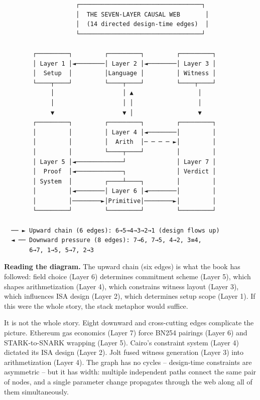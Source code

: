 \documentclass[
  11pt,
  openany]{report}
\renewcommand{\textbf}[1]{{\bfseries\color{MidnightBold}#1}}
\begin{document}
\begin{verbatim}
                    ┌──────────────────────────────────┐
                    │  THE SEVEN-LAYER CAUSAL WEB       │
                    │  (14 directed design-time edges)  │
                    └──────────────────────────────────┘

        ┌─────────┐         ┌─────────┐         ┌─────────┐
        │ Layer 1 │◄────────│ Layer 2 │◄────────│ Layer 3 │
        │  Setup  │         │Language │         │ Witness │
        └────┬────┘         └────┬────┘         └────┬────┘
             │                   │ ▲                  │
             │                   │ │                  │
             ▼                   ▼ │                  ▼
        ┌─────────┐         ┌─────────┐         ┌─────────┐
        │         │         │ Layer 4 │◄────────│         │
        │         │         │  Arith  │─ ─ ─ ─ ►│         │
        │         │         └────┬────┘         │         │
        │ Layer 5 │◄─────────────┘              │ Layer 7 │
        │  Proof  │◄─────────────┐              │ Verdict │
        │ System  │         ┌────┴────┐         │         │
        │         │◄────────│ Layer 6 │◄────────│         │
        │         │────────►│Primitive│────────►│         │
        └─────────┘         └─────────┘         └─────────┘

  ── ► Upward chain (6 edges): 6→5→4→3→2→1 (design flows up)
  ◄ ── Downward pressure (8 edges): 7→6, 7→5, 4→2, 3≡4,
       6→7, 1→5, 5→7, 2→3
\end{verbatim}

\textbf{Reading the diagram.} The upward chain (six edges) is what the book has
followed: field choice (Layer 6) determines commitment scheme (Layer 5), which
shapes arithmetization (Layer 4), which constrains witness layout (Layer 3),
which influences ISA design (Layer 2), which determines setup scope (Layer 1).
If this were the whole story, the stack metaphor would suffice.

It is not the whole story. Eight downward and cross-cutting edges complicate the
picture. Ethereum gas economics (Layer 7) force BN254 pairings (Layer 6) and
STARK-to-SNARK wrapping (Layer 5). Cairo's constraint system (Layer 4) dictated
its ISA design (Layer 2). Jolt fused witness generation (Layer 3) into
arithmetization (Layer 4). The graph has no cycles -- design-time constraints
are asymmetric -- but it has width: multiple independent paths connect the same
pair of nodes, and a single parameter change propagates through the web along
all of them simultaneously.
\end{document}
